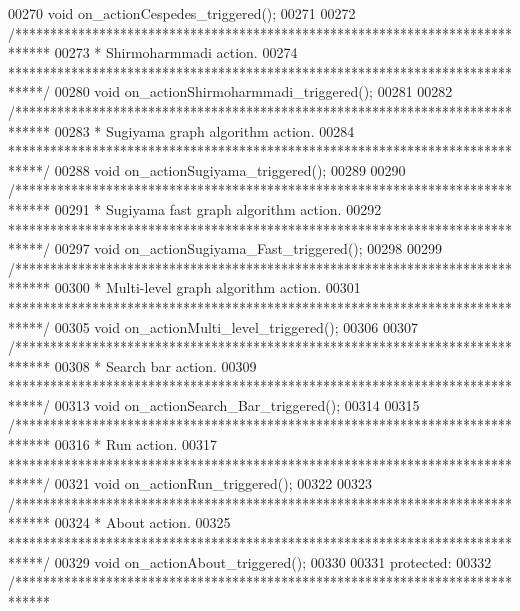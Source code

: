 \begin{DoxyCode}
00270   \textcolor{keywordtype}{void} on\_actionCespedes\_triggered();
00271 
00272   \textcolor{comment}{/*****************************************************************************}
00273 \textcolor{comment}{  * Shirmoharmmadi action.}
00274 \textcolor{comment}{  *****************************************************************************/}
00280   \textcolor{keywordtype}{void} on\_actionShirmoharmmadi\_triggered();
00281 
00282   \textcolor{comment}{/*****************************************************************************}
00283 \textcolor{comment}{  * Sugiyama graph algorithm action.}
00284 \textcolor{comment}{  *****************************************************************************/}
00288   \textcolor{keywordtype}{void} on\_actionSugiyama\_triggered();
00289 
00290   \textcolor{comment}{/*****************************************************************************}
00291 \textcolor{comment}{  * Sugiyama fast graph algorithm action.}
00292 \textcolor{comment}{  *****************************************************************************/}
00297   \textcolor{keywordtype}{void} on\_actionSugiyama\_Fast\_triggered();
00298 
00299   \textcolor{comment}{/*****************************************************************************}
00300 \textcolor{comment}{  * Multi-level graph algorithm action.}
00301 \textcolor{comment}{  *****************************************************************************/}
00305   \textcolor{keywordtype}{void} on\_actionMulti\_level\_triggered();
00306 
00307   \textcolor{comment}{/*****************************************************************************}
00308 \textcolor{comment}{  * Search bar action.}
00309 \textcolor{comment}{  *****************************************************************************/}
00313   \textcolor{keywordtype}{void} on\_actionSearch\_Bar\_triggered();
00314 
00315   \textcolor{comment}{/*****************************************************************************}
00316 \textcolor{comment}{  * Run action.}
00317 \textcolor{comment}{  *****************************************************************************/}
00321   \textcolor{keywordtype}{void} on\_actionRun\_triggered();
00322 
00323   \textcolor{comment}{/*****************************************************************************}
00324 \textcolor{comment}{  * About action.}
00325 \textcolor{comment}{  *****************************************************************************/}
00329   \textcolor{keywordtype}{void} on\_actionAbout\_triggered();
00330 
00331 \textcolor{keyword}{protected}:
00332   \textcolor{comment}{/*****************************************************************************}

\end{DoxyCode}
